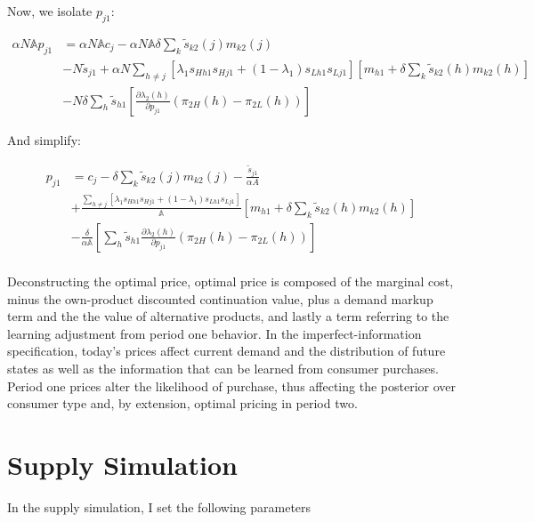 \documentclass[11pt]{article}
\theoremstyle{definition}
\theoremstyle{remark}
\begin{document}
Now, we isolate $p_{j1}$:

\begin{align*}
  \alpha N\mathbb{A}p_{j1} &= \alpha N\mathbb{A}c_j - \alpha N\mathbb{A}\delta\sum_k\tilde{s}_{k2}(j)m_{k2}(j) \\
  &- N\tilde{s}_{j1} + \alpha N\sum_{h\ne j}[\lambda_1s_{Hh1}s_{Hj1} + (1-\lambda_1)s_{Lh1}s_{Lj1}][m_{h1}+\delta\sum_k\tilde{s}_{k2}(h)m_{k2}(h)] \\
  &- N\delta\sum_h\tilde{s}_{h1}[\frac{\partial\lambda_2(h)}{\partial p_{j1}}(\pi_{2H}(h) - \pi_{2L}(h))]
\end{align*}

And simplify:

\begin{align*}
  p_{j1} &= c_j -\delta\sum_k\tilde{s}_{k2}(j)m_{k2}(j) - \frac{\tilde{s}_{j1}}{\alpha A} \\
  &+ \frac{\sum_{h\ne j}[\lambda_1s_{Hh1}s_{Hj1} + (1-\lambda_1)s_{Lh1}s_{Lj1}]}{\mathbb{A}}[m_{h1} + \delta\sum_k\tilde{s}_{k2}(h)m_{k2}(h)] \\
  &- \frac{\delta}{\alpha \mathbb{A}}[\sum_h\tilde{s}_{h1}\frac{\partial\lambda_2(h)}{\partial   p_{j1}}(\pi_{2H}(h) - \pi_{2L}(h))] \\
\end{align*}


Deconstructing the optimal price, optimal price is composed of the marginal cost, minus the own-product discounted continuation value, plus a demand markup term and the the value of alternative products, and lastly a term referring to the learning adjustment from period one behavior. In the imperfect-information specification, today's prices affect current demand and the distribution of future states as well as the information that can be learned from consumer purchases. Period one prices alter the likelihood of purchase, thus affecting the posterior over consumer type and, by extension, optimal pricing in period two.

\section{Supply Simulation}

In the supply simulation, I set the following parameters
\end{document}
